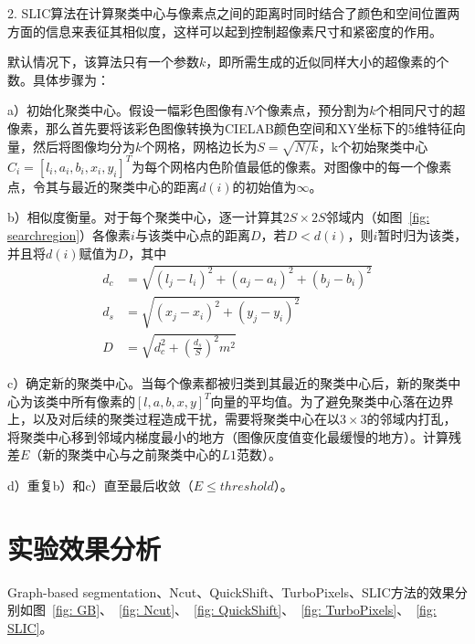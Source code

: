 \documentclass[12pt]{article}
\begin{document}
2. SLIC算法在计算聚类中心与像素点之间的距离时同时结合了颜色和空间位置两方面的信息来表征其相似度，这样可以起到控制超像素尺寸和紧密度的作用。

默认情况下，该算法只有一个参数$k$，即所需生成的近似同样大小的超像素的个数。具体步骤为：

a）初始化聚类中心。假设一幅彩色图像有$N$个像素点，预分割为$k$个相同尺寸的超像素，那么首先要将该彩色图像转换为CIELAB颜色空间和XY坐标下的5维特征向量，然后将图像均分为$k$个网格，网格边长为$S=\sqrt{N/k}$，k个初始聚类中心$C_i=[l_i, a_i, b_i, x_i, y_i]^T$为每个网格内色阶值最低的像素。对图像中的每一个像素点，令其与最近的聚类中心的距离$d(i)$的初始值为$\infty$。

b）相似度衡量。对于每个聚类中心，逐一计算其$2S \times 2S$邻域内（如图~\ref{fig: searchregion}）各像素$i$与该类中心点的距离$D$，若$D<d(i)$，则$i$暂时归为该类，并且将$d(i)$赋值为$D$，其中
\begin{align}
d_c & =  \sqrt{(l_j-l_i)^2+(a_j-a_i)^2+(b_j-b_i)^2}\\
d_s & =  \sqrt{(x_j-x_i)^2+(y_j-y_i)^2}\\
D & =  \sqrt{d_c^2+\left(\frac{d_s}{S}\right)^2m^2}
\end{align}

c）确定新的聚类中心。当每个像素都被归类到其最近的聚类中心后，新的聚类中心为该类中所有像素的$[l, a, b, x, y]^T$向量的平均值。为了避免聚类中心落在边界上，以及对后续的聚类过程造成干扰，需要将聚类中心在以$3\times3$的邻域内打乱，将聚类中心移到邻域内梯度最小的地方（图像灰度值变化最缓慢的地方）。计算残差$E$（新的聚类中心与之前聚类中心的$L1$范数）。

d）重复b）和c）直至最后收敛（$E\le threshold$）。

\section{实验效果分析}

Graph-based segmentation、Ncut、QuickShift、TurboPixels、SLIC方法的效果分别如图~\ref{fig: GB}、~\ref{fig: Ncut}、~\ref{fig: QuickShift}、~\ref{fig: TurboPixels}、~\ref{fig: SLIC}。
\end{document}
